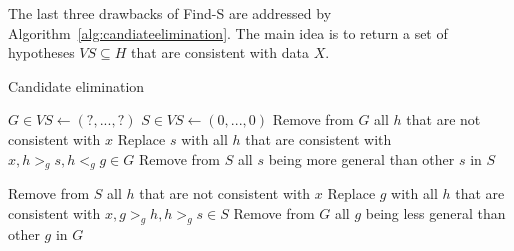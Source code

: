 \documentclass{report}
\begin{document}
The last three drawbacks of Find-S are addressed by Algorithm~\ref{alg:candiateelimination}. The main idea is to return a set of hypotheses $VS\subseteq H$ that are consistent with data $X$.

\begin{algorithm}
\caption{Candidate elimination}
\label{alg:candidateelimation}
\begin{algorithmic}
\State $G\in VS \gets (?,...,?)$ 
\State $S\in VS \gets (0,...,0)$ 
\State Remove from $G$ all $h$ that are not consistent with $x$
\State Replace $s$ with all $h$ that are consistent with $x, h>_g s, h<_g g\in G$
\State Remove from $S$ all $s$ being more general than other $s$ in $S$
\EndFor
\EndIf

\State Remove from $S$ all $h$ that are not consistent with $x$
\State Replace $g$ with all $h$ that are consistent with $x, g>_g h, h>_g s\in S$
\State Remove from $G$ all $g$ being less general than other $g$ in $G$
\EndFor
\EndIf
\EndFor
\\
\end{algorithmic}
\end{algorithm}
\end{document}
